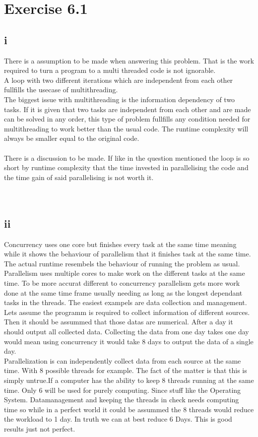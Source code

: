 \documentclass[a4paper]{article}
\begin{document}
\section*{Exercise 6.1}
\subsection*{i}
There is a assumption to be made when answering this problem. That is the work required to turn a program to a multi threaded code is not ignorable. \\
A loop with two different iterations which are independent from each other fullfills the usecase of multithreading. \\
The biggest issue with multithreading is the information dependency of two tasks. If it is given that two tasks are independent from each other and are made can be solved in any order, this type of problem fullfills any condition needed for multithreading to work better than the usual code. The runtime complexity will always be smaller equal to the original code.\\
\\
There is a discussion to be made. If like in the question mentioned the loop is so short by runtime complexity that the time invested in parallelising the code and the time gain of said parallelising is not worth it. \\
\\
\\
\subsection*{ii}
Concurrency uses one core but finishes every task at the same time meaning while it shows the behaviour of parallelism that it finishes task at the same time. The actual runtime resembels the behaviour of running the problem as usual.
\\
Parallelism uses multiple cores to make work on the different tasks at the same time. To be more accurat different to concurrency parallelism gets more work done at the same time frame usually needing as long as the longest dependant tasks in the threads. The easiest exampels are data collection and management. Lets assume the programm is required to collect information of different sources. Then it should be assummed that those datas are numerical. After a day it should output all collected data. Collecting the data from one day takes one day would mean using concurrency it would take 8 days to output the data of a single day. \\
Parallelization is can independently collect data from each source at the same time. With 8 possible threads for example. The fact of the matter is that this is simply untrue.If a computer has the ability to keep 8 threads running at the same time. Only 6 will be used for purely computing. Since stuff like the Operating System. Datamanagement and keeping the threads in check needs computing time so while in a perfect world it could be assummed the 8 threads would reduce the workload to 1 day. In truth we can at best reduce 6 Days. This is good results just not perfect.
\end{document}
